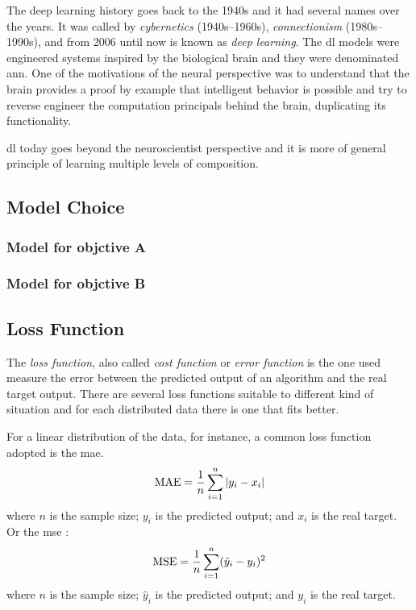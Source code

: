 The deep learning history goes back to the 1940s and it had several names over the years. It was called by \emph{cybernetics} (1940s--1960s), \emph{connectionism} (1980s--1990s), and from 2006 until now is known as \emph{deep learning}.
The \gls*{dl} models were engineered systems inspired by the biological brain and they were denominated \gls*{ann}.
One of the motivations of the neural  perspective was to understand that the brain provides a proof by example that intelligent behavior is possible and try to reverse engineer the computation principals behind the brain, duplicating its functionality.

\gls*{dl} today goes beyond the neuroscientist perspective and it is more of general principle of learning multiple levels of composition.

\subsection{Model Choice}

\subsubsection*{Model for objctive A}
\subsubsection*{Model for objctive B}

\subsection{Loss Function}

The \emph{loss function}, also called \emph{cost function} or \emph{error function} is the one used measure the error between the predicted output of an algorithm and the real target output. There are several loss functions suitable to different kind of situation and for each distributed data there is one that fits better.

For a linear distribution of the data, for instance, a common loss function adopted is the \gls*{mae}.
%
\begin{equation}
    \text{MAE} = \frac{1}{n} \sum_{i=1}^n |y_i - x_i|
    \label{eq:mae}
\end{equation}
%
where \(n\) is the sample size; \(y_i\) is the predicted output; and \(x_i\) is the real target. Or the \gls*{mse} \cite{bussab2017}:
%
\begin{equation}
    \text{MSE} = \frac{1}{n} \sum_{i=1}^n (\hat{y}_i - y_i)^2
    \label{eq:mse}
\end{equation}
%
where \(n\) is the sample size; \(\hat{y}_i\) is the predicted output; and \(y_i\) is the real target.

